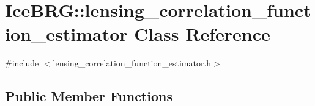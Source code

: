 \hypertarget{classIceBRG_1_1lensing__correlation__function__estimator}{}\section{Ice\+B\+R\+G\+:\+:lensing\+\_\+correlation\+\_\+function\+\_\+estimator Class Reference}
\label{classIceBRG_1_1lensing__correlation__function__estimator}


{\ttfamily \#include $<$lensing\+\_\+correlation\+\_\+function\+\_\+estimator.\+h$>$}

\subsection*{Public Member Functions}
